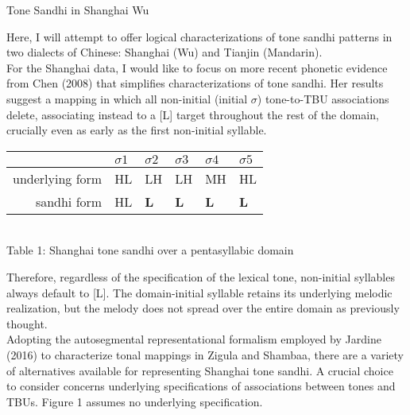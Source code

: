 \documentclass{article}
\begin{document}
\begin{center}
\Large{Tone Sandhi in Shanghai Wu}
\end{center} 
\vspace{.5cm} 
\par \indent
Here, I will attempt to offer logical characterizations of tone sandhi patterns in two dialects of Chinese: Shanghai (Wu) and Tianjin (Mandarin).\\
\indent
For the Shanghai data, I would like to focus on more recent phonetic evidence from Chen (2008) that simplifies characterizations of tone sandhi. Her results suggest a mapping in which all non-initial (initial $\sigma$) tone-to-TBU associations delete, associating instead to a [L] target throughout the rest of the domain, crucially even as early as the first non-initial syllable.
\vspace{.3cm}
\begin{center}
\begin{tabular} {rlllll}
	& $\sigma 1$ & $\sigma 2$ & $\sigma 3$ & $\sigma 4$ & $\sigma 5$ \\
	\hline
	underlying form & HL & LH& LH & MH & HL \\
	sandhi form & HL & \textbf{L} & \textbf{L} & \textbf{L} & \textbf{L} \\
	\hline
\end{tabular}\\
\smallskip{}
Table 1: Shanghai tone sandhi over a pentasyllabic domain
\end{center}	
\vspace{.3cm}
Therefore, regardless of the specification of the lexical tone, non-initial syllables always default to [L]. The domain-initial syllable retains its underlying melodic realization, but the melody does not spread over the entire domain as previously thought.\\
\indent
Adopting the autosegmental representational formalism employed by Jardine (2016) to characterize tonal mappings in Zigula and Shambaa, there are a variety of alternatives available for representing Shanghai tone sandhi. A crucial choice to consider concerns underlying specifications of associations between tones and TBUs. Figure 1 assumes no underlying specification.
\end{document}
